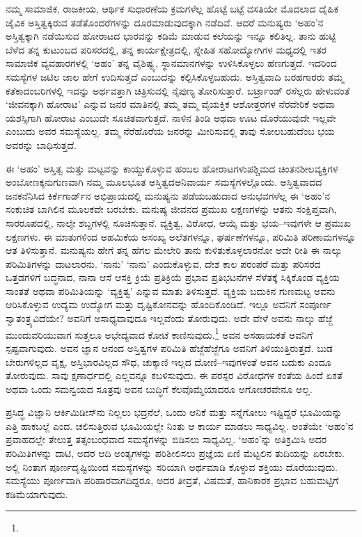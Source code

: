 ನಮ್ಮ ಸಾಮಾಜಿಕ, ರಾಜಕೀಯ, ಆರ್ಥಿಕ ಸುಧಾರಣೆಯ ಕ್ರಮಗಳೆಲ್ಲ ಹೊಟ್ಟೆ ಬಟ್ಟೆ ವಸತಿಯೇ ಮೊದಲಾದ ದೈಹಿಕ ಜೈವಿಕ ಅಸ್ತಿತ್ವಕ್ಕಿರುವ ತಡೆತೊಂದರೆಗಳನ್ನು ದೂರಮಾಡುವುದಕ್ಕಾಗಿ ನಡೆದಿವೆ. ಆದರೆ ಮನುಷ್ಯರು ‘ಅಹಂ’ನ ಅಸ್ತಿತ್ವಕ್ಕಾಗಿ ನಡೆಯಿಸುವ ಹೋರಾಟದ ಭಾರವನ್ನು ಕಡಿಮೆ ಮಾಡುವ ಕಲೆಯನ್ನು ಇನ್ನೂ ಕಲಿತಿಲ್ಲ. ತಾನು ಹುಟ್ಟಿ ಬೆಳೆದ ತನ್ನ ಕುಟುಂಬದ ಪರಿಸರದಲ್ಲಿ, ತನ್ನ ಕಾರ್ಯಕ್ಷೇತ್ರದಲ್ಲಿ, ಸ್ನೇಹಿತ ಸಹೋದ್ಯೋಗಿಗಳ ಮಧ್ಯದಲ್ಲಿ ಇತರ ಸಾಮಾಜಿಕ ವ್ಯವಹಾರಗಳಲ್ಲಿ ‘ಅಹಂ’ ತನ್ನ ವೈಶಿಷ್ಟ್ಯ, ಸ್ಥಾನಮಾನಗಳನ್ನು ಉಳಿಸಿಕೊಳ್ಳಲು ಹೆಣಗುತ್ತದೆ. ಇದರಿಂದ ಸಮಸ್ಯೆಗಳ ಜಟಿಲ ಜಾಲ ಹೇಗೆ ಉದಿಸುತ್ತದೆ ಎಂಬುದನ್ನು ಕಲ್ಪಿಸಿಕೊಳ್ಳಬಹುದು. ಅಸ್ತಿತ್ವವಾದಿ ಬರಹಗಾರರು ತಮ್ಮ ಕತೆಕಾದಂಬರಿಗಳಲ್ಲಿ ಇದನ್ನು ಅರ್ಥವತ್ತಾಗಿ ಚಿತ್ರಿಸುವಲ್ಲಿ ನೈಪುಣ್ಯ ತೋರಿಸುತ್ತಾರೆ. ಬರ್ಟ್ರಾಂಡ್ ರಸೆಲ್ಲರು ಹೇಳುವಂತೆ ‘ಜೀವನಕ್ಕಾಗಿ ಹೋರಾಟ’ ಎನ್ನುವ ಜನರ ಮಾತಿನಲ್ಲಿ ತಮ್ಮ ತಮ್ಮ ವೈಯಕ್ತಿಕ ಆಶೋತ್ತರಗಳ ನೆರವೇರಿಕೆ ಅಥವಾ ಯಶಸ್ಸಿಗಾಗಿ ಹೋರಾಟ ಎಂಬುದೇ ಸೂಚಿತವಾಗುತ್ತದೆ. ನಾಳಿನ ತಿಂಡಿ ಅಥವಾ ಊಟ ದೊರೆಯುವುದೇ ಇಲ್ಲವೇ ಎಂಬುದು ಅವರ ಸಮಸ್ಯೆಯಲ್ಲ. ತಮ್ಮ ನೆರೆಹೊರೆಯ ಜನರನ್ನು ಮೀರಿಸುವಲ್ಲಿ ತಾವು ಸೋಲಬಹುದೆಂಬ ಭಯ ಅವರನ್ನು ಬಾಧಿಸುತ್ತದೆ.

ಈ ‘ಅಹಂ’ ಅಸ್ತಿತ್ವ ಮತ್ತು ಮಟ್ಟವನ್ನು ಕಾಯ್ದುಕೊಳ್ಳುವ ಹಂಬಲ ಹೋರಾಟಗಳು\break ಪಶ್ಚಿಮದ ಚಿಂತನಶೀಲವ್ಯಕ್ತಿಗಳ ಅಂಬೋಣಕ್ಕನುಗುಣವಾಗಿ ನಮ್ಮ ಮೂಲಭೂತ ಅಸ್ತಿತ್ವದ\break ಅನಿವಾರ್ಯ ಸಮಸ್ಯೆಗಳಲ್ಲೊಂದು. ಅಸ್ತಿತ್ವವಾದದ ಜನಕನೆನಿಸಿದ ಕಿರ್ಕೆಗಾರ್ಡ್​ನ ಅಭಿಪ್ರಾಯದಲ್ಲಿ ಮನುಷ್ಯನು ಪಡೆಯಬಹುದಾದ ಅನುಭವಗಳೆಲ್ಲ ಈ ‘ಅಹಂ’ನ ಸಂಕುಚಿತ ಬಾಗಿಲಿನ ಮೂಲಕವೇ ಬರಬೇಕು. ಮನುಷ್ಯ ಜೀವನದ ಪ್ರಮುಖ ಲಕ್ಷಣಗಳನ್ನು ಆತನು ಸಂಕ್ಷಿಪ್ತವಾಗಿ, ಸಾರರೂಪದಲ್ಲಿ, ನಾಲ್ಕೇ ಶಬ್ದಗಳಲ್ಲಿ ಸೂಚಿಸುತ್ತಾನೆ. ವ್ಯಕ್ತಿತ್ವ, ವಿರೋಧ, ಆಯ್ಕೆ ಮತ್ತು ಭಯ–ಇವುಗಳೇ ಆ ಪ್ರಮುಖ ಲಕ್ಷಣಗಳು. ಈ ಮಾತುಗಳಿಂದ ಅಹಮಿಕೆಯ ಅಸಂಖ್ಯ ಅಲೆತಗಳನ್ನೂ, ಘರ್ಷಣೆಗಳನ್ನೂ, ಪರಿಮಿತಿ ಪರಿಣಾಮಗಳನ್ನೂ ಆತ ತಿಳಿಸುತ್ತಾನೆ. ಮನುಷ್ಯನು ಹೇಗೆ ತನ್ನ ಹೆಗಲ ಮೇಲೇರಿ ತಾನು ಕುಳಿತುಕೊಳ್ಳಲಾರನೋ ಅದೇ ರೀತಿ ಈ ನಾಲ್ಕು ಪರಿಮಿತಿಗಳನ್ನು ದಾಟಲಾರನು. ‘ನಾನು’ ‘ನಾನು’ ಎಂದುಕೊಳ್ಳುವ, ದೇಶ ಕಾಲ ಪರಂಪರೆ ಮತ್ತು ಪರಿಸರದ ಒತ್ತಡಗಳಿಗೆ ಬದ್ಧನಾದ, ನಾನಾ ಆಸೆ ಆಸಕ್ತಿ ಕ್ರಿಯೆ ಪ್ರತಿಕ್ರಿಯೆ ಪ್ರಭಾವ ಪ್ರತಿಭಟನೆಗಳ ಸೆಳೆತಕ್ಕೆ ಸಿಕ್ಕಿಕೊಂಡ ವ್ಯಕ್ತಿಯ ಸಾಂತತೆ ಅಥವಾ ಪರಿಮಿತಿಯನ್ನು ‘ವ್ಯಕ್ತಿತ್ವ’ ಎನ್ನುವ ಮಾತು ತಿಳಿಸುತ್ತದೆ. ವ್ಯಕ್ತಿಯ ಬದುಕಿನ ಗುಣಮಟ್ಟ ಅವನು ಆರಿಸಿಕೊಳ್ಳುವ ಉದ್ಯಮ ಉದ್ಯೋಗ ಮತ್ತು ದೃಷ್ಟಿಕೋನವನ್ನು ಹೊಂದಿಕೊಂಡಿದೆ. ಇಲ್ಲೂ ಅವನಿಗೆ ಸಂಪೂರ್ಣ ಸ್ವಾತಂತ್ರ್ಯವಿದೆಯೇ? ಅವನಿಗೆ ಅಸಾಧ್ಯವಾವುದೂ ಇಲ್ಲವೆಂದು ತೋರುವುದು. ಅದೇ ವೇಳೆ ಅವನು ನಾಲ್ಕು ಹೆಜ್ಜೆ ಮುಂದುವರಿಯುವಾಗ ಸುತ್ತಲೂ ಅಭೇದ್ಯವಾದ ಕೋಟೆ ಕಾಣಿಸುವುದು.\footnote{

} ಅವನ ಅಸಹಾಯಕತೆ ಅವನಿಗೆ ಸ್ಪಷ್ಟವಾಗುವುದು. ಅವನ ಜ್ಞಾನ ಆನಂದ ಅಸ್ತಿತ್ವಗಳ ಪರಿಮಿತಿ ಹೆಜ್ಜೆಹೆಜ್ಜೆಗೂ \hbox{ಅವನಿಗೆ} ತಿಳಿಯುತ್ತಿರುತ್ತದೆ. ಬುಡ ಬೇರುಗಳಿಲ್ಲದ ವೃಕ್ಷ, ಅಸ್ತಿಭಾರವಿಲ್ಲದ ಸೌಧ, ಚುಕ್ಕಾಣಿ ಇಲ್ಲದ ದೋಣಿ–ಇವುಗಳಂತೆ ಅವನ ಬದುಕು ಎಂದೂ ತೋರುವುದು. ಸಾವು ಕ್ಷಣಾರ್ಧದಲ್ಲಿ ಎಲ್ಲವನ್ನೂ ಕಬಳಿಸುವುದು. ಈ ಪರಸ್ಪರ ವಿರೋಧಗಳ ಕಂತೆಯ ಹಿಂದೆ ಏಕತೆ ಅಥವಾ ಒಂದು ಸಮನ್ವಯದ ಸೂತ್ರವು ಅವನ ಬುದ್ಧಿಗೆ ಕೆಲವೊಮ್ಮೆಯಾದರೂ ಅಗೋಚರವೇನೂ ಅಲ್ಲ.

ಪ್ರಸಿದ್ಧ ವಿಜ್ಞಾನಿ ಆರ್ಕಿಮಿಡೀಸ್​ನು ನಿಲ್ಲಲು ಭದ್ರನೆಲೆ, ಒಂದು ಆನಿಕೆ ಮತ್ತು ಸನ್ನೆಗೋಲು ಇಷ್ಟಿದ್ದರೆ ಭೂಮಿಯನ್ನು ಎತ್ತಿ ಹಾಕಬಲ್ಲೆ ಎಂದ. ಚಲಿಸುತ್ತಿರುವ ಭೂಮಿಯಲ್ಲೇ ನಿಂತು ಆ ಕಾರ್ಯ ಮಾಡಲು ಸಾಧ್ಯವಿಲ್ಲ. ಅಂತೆಯೇ ‘ಅಹಂ’ನ ಪ್ರವಾಹದಲ್ಲೇ ತೇಲುತ್ತ ತತ್ಸಂಬಂಧವಾದ ಸಮಸ್ಯೆಗಳನ್ನು ಬಿಡಿಸಲು ಸಾಧ್ಯವಿಲ್ಲ. ‘ಅಹಂ’ನ್ನು ಅತಿಕ್ರಮಿಸಿ ಅದರ ಪರಿಮಿತಿಗಳನ್ನು ದಾಟಿ, ಅದರ ಆದಿ ಅಂತ್ಯಗಳನ್ನು ಪರಿಶೀಲಿಸಲು ಪ್ರಜ್ಞೆಯ ಏಣಿ ಮೆಟ್ಟಲಿನ ತುದಿಯನ್ನು ಏರಬೇಕು. ಅಲ್ಲಿ ನಿಂತಾಗ ಪೂರ್ಣದೃಷ್ಟಿಯಿಂದ ಸಮಸ್ಯೆಗಳನ್ನು ಸರಿಯಾಗಿ ಅರ್ಥಮಾಡಿ ಕೊಳ್ಳುವ ಶಕ್ತಿಯು ದೊರೆಯುವುದು. ಸಮಸ್ಯೆಯು ಪೂರ್ಣವಾಗಿ ಪರಿಹಾರವಾಗದಿದ್ದರೂ, ಅದರ ತೀವ್ರತೆ, ವಿಷಮತೆ, ಹಾನಿಕಾರಕ ಪ್ರಭಾವ ಬಹುಮಟ್ಟಿಗೆ ಕಡಿಮೆಯಾಗುವುದು.

